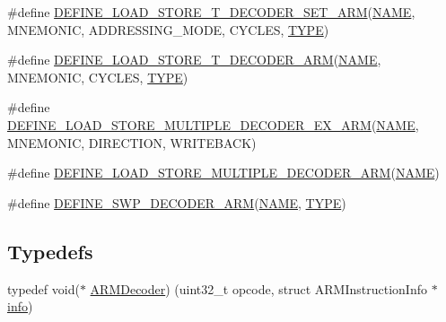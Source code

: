 \begin{DoxyCompactItemize}
\item 
\#define \mbox{\hyperlink{decoder-arm_8c_ab559b15c86f080c2ffff1edf8ad0d9ce}{D\+E\+F\+I\+N\+E\+\_\+\+L\+O\+A\+D\+\_\+\+S\+T\+O\+R\+E\+\_\+\+T\+\_\+\+D\+E\+C\+O\+D\+E\+R\+\_\+\+S\+E\+T\+\_\+\+A\+RM}}(\mbox{\hyperlink{inflate_8h_a164ea0159d5f0b5f12a646f25f99eceaa67bc2ced260a8e43805d2480a785d312}{N\+A\+ME}},  M\+N\+E\+M\+O\+N\+IC,  A\+D\+D\+R\+E\+S\+S\+I\+N\+G\+\_\+\+M\+O\+DE,  C\+Y\+C\+L\+ES,  \mbox{\hyperlink{inflate_8h_a164ea0159d5f0b5f12a646f25f99eceaab47ea8bb955afd0adc0ef98517dd6084}{T\+Y\+PE}})
\item 
\#define \mbox{\hyperlink{decoder-arm_8c_af75e93a1da66b50d8c742f497515aa20}{D\+E\+F\+I\+N\+E\+\_\+\+L\+O\+A\+D\+\_\+\+S\+T\+O\+R\+E\+\_\+\+T\+\_\+\+D\+E\+C\+O\+D\+E\+R\+\_\+\+A\+RM}}(\mbox{\hyperlink{inflate_8h_a164ea0159d5f0b5f12a646f25f99eceaa67bc2ced260a8e43805d2480a785d312}{N\+A\+ME}},  M\+N\+E\+M\+O\+N\+IC,  C\+Y\+C\+L\+ES,  \mbox{\hyperlink{inflate_8h_a164ea0159d5f0b5f12a646f25f99eceaab47ea8bb955afd0adc0ef98517dd6084}{T\+Y\+PE}})
\item 
\#define \mbox{\hyperlink{decoder-arm_8c_a056ce03038f484c172fd8a83f22f073a}{D\+E\+F\+I\+N\+E\+\_\+\+L\+O\+A\+D\+\_\+\+S\+T\+O\+R\+E\+\_\+\+M\+U\+L\+T\+I\+P\+L\+E\+\_\+\+D\+E\+C\+O\+D\+E\+R\+\_\+\+E\+X\+\_\+\+A\+RM}}(\mbox{\hyperlink{inflate_8h_a164ea0159d5f0b5f12a646f25f99eceaa67bc2ced260a8e43805d2480a785d312}{N\+A\+ME}},  M\+N\+E\+M\+O\+N\+IC,  D\+I\+R\+E\+C\+T\+I\+ON,  W\+R\+I\+T\+E\+B\+A\+CK)
\item 
\#define \mbox{\hyperlink{decoder-arm_8c_a0675663335afa1ce371d54f3a36028dc}{D\+E\+F\+I\+N\+E\+\_\+\+L\+O\+A\+D\+\_\+\+S\+T\+O\+R\+E\+\_\+\+M\+U\+L\+T\+I\+P\+L\+E\+\_\+\+D\+E\+C\+O\+D\+E\+R\+\_\+\+A\+RM}}(\mbox{\hyperlink{inflate_8h_a164ea0159d5f0b5f12a646f25f99eceaa67bc2ced260a8e43805d2480a785d312}{N\+A\+ME}})
\item 
\#define \mbox{\hyperlink{decoder-arm_8c_a808a5c0ec2d14ddd88829aba72bb1b05}{D\+E\+F\+I\+N\+E\+\_\+\+S\+W\+P\+\_\+\+D\+E\+C\+O\+D\+E\+R\+\_\+\+A\+RM}}(\mbox{\hyperlink{inflate_8h_a164ea0159d5f0b5f12a646f25f99eceaa67bc2ced260a8e43805d2480a785d312}{N\+A\+ME}},  \mbox{\hyperlink{inflate_8h_a164ea0159d5f0b5f12a646f25f99eceaab47ea8bb955afd0adc0ef98517dd6084}{T\+Y\+PE}})
\end{DoxyCompactItemize}
\subsection*{Typedefs}
\begin{DoxyCompactItemize}
\item 
typedef void($\ast$ \mbox{\hyperlink{decoder-arm_8c_ae607effbe3bf4de4aa7445cfb2ba2f67}{A\+R\+M\+Decoder}}) (uint32\+\_\+t opcode, struct A\+R\+M\+Instruction\+Info $\ast$\mbox{\hyperlink{libretro_8h_a283ad41e4809f9c0ebe736a9861d8a91}{info}})
\end{DoxyCompactItemize}
